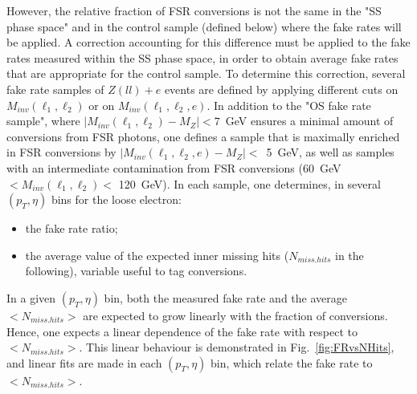However, the relative fraction of FSR conversions is not the same in the "SS phase space"
and in the control sample (defined below) where the fake rates will be applied. A correction
accounting for this difference must be applied to the fake rates measured within 
the SS phase space, in order to obtain
average fake rates that are appropriate for the control sample.
To determine this correction,
several fake rate samples of $Z(ll) + e$ events are defined by applying different 
cuts on $M_{inv}(\ell_{1},\ell_{2})$ or on $M_{inv}(\ell_{1},\ell_{2}, e)$.
In addition to the "OS fake rate sample", where $|M_{inv}(\ell_{1},\ell_{2}) - M_{Z}| < 7 $~GeV ensures
a minimal amount of conversions from FSR photons, one defines a sample that is
maximally enriched in FSR conversions by
$ | M_{inv}(\ell_{1},\ell_{2}, e) - M_Z | < $~5~GeV,
as well as samples with 
an intermediate contamination from FSR conversions (60~GeV $< M_{inv}(\ell_{1},\ell_{2}) < $ 120~GeV).
In each sample, one determines, in several $(p_T, \eta)$ bins for the loose electron:
\begin{itemize}
 \item the fake rate ratio;
 \item the average value of the expected inner missing hits ($N_{miss. hits}$ in the following), variable useful to tag conversions. 
\end{itemize}
%


In a given $(p_T, \eta)$  bin, both the measured fake rate and the
average $ < N_{miss. hits} > $ are expected to grow linearly with the fraction
of conversions. 
Hence, one expects a linear dependence of the fake rate with respect to $ < N_{miss. hits} > $.
This linear behaviour is demonstrated in Fig.~\ref{fig:FRvsNHits}, and linear fits are made
in each $(p_T, \eta)$  bin, which relate the fake rate to $ < N_{miss. hits} > $.

